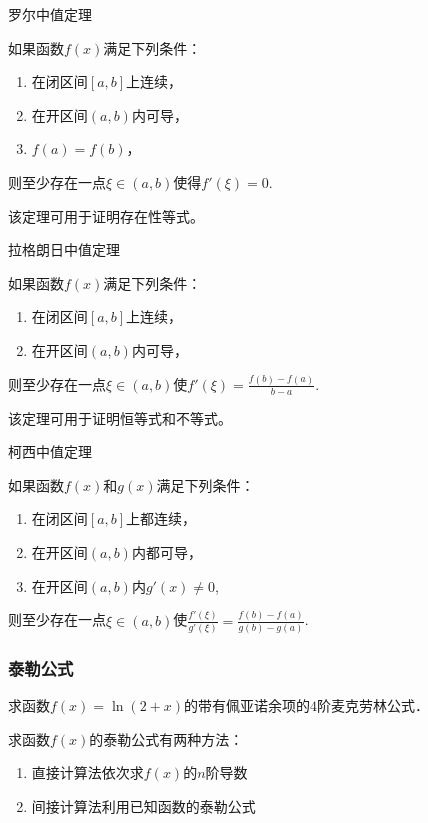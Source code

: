 \documentclass[14pt,notheorems,leqno,xcolor={rgb}]{beamer} %
\begin{document}
\begin{frame}{罗尔中值定理}
\begin{theorem*}
如果函数$f(x)$满足下列条件：
\begin{enumerate}
\item 在闭区间$[a,b]$上连续，
\item 在开区间$(a,b)$内可导，
\item $f(a)=f(b)$，
\end{enumerate}
则至少存在一点$\xi\in(a,b)$使得$f'(\xi)=0$.
\end{theorem*}
\pause
\begin{fact*}该定理可用于证明存在性等式。\end{fact*}
\end{frame}

\begin{frame}{拉格朗日中值定理}
\begin{theorem*}
如果函数$f(x)$满足下列条件：
\begin{enumerate}
\item 在闭区间$[a,b]$上连续，
\item 在开区间$(a,b)$内可导，
\end{enumerate}
则至少存在一点$\xi\in(a,b)$使$f'(\xi)=\frac{f(b)-f(a)}{b-a}$.
\end{theorem*}
\pause
\begin{fact*}该定理可用于证明恒等式和不等式。\end{fact*}
\end{frame}

\begin{frame}{柯西中值定理}
\begin{theorem*}
如果函数$f(x)$和$g(x)$满足下列条件：
\begin{enumerate}
\item 在闭区间$[a,b]$上都连续，
\item 在开区间$(a,b)$内都可导，
\item 在开区间$(a,b)$内$g'(x)\neq0$,
\end{enumerate}
则至少存在一点$\xi\in(a,b)$使$\frac{f'(\xi)}{g'(\xi)}=\frac{f(b)-f(a)}{g(b)-g(a)}$.
\end{theorem*}
\end{frame}

\ifligong
\begin{frame}
\frametitle{泰勒公式}
\begin{example}
求函数$f(x)=\ln(2+x)$的带有佩亚诺余项的$4$阶麦克劳林公式．
\end{example}
\vpause
\begin{remark*}
求函数$f(x)$的泰勒公式有两种方法：
\begin{enumerate}
  \item 直接计算法\cdotfill 依次求$f(x)$的$n$阶导数
  \item 间接计算法\cdotfill 利用已知函数的泰勒公式
\end{enumerate}
\end{remark*}
\end{frame}
\fi
\end{document}
